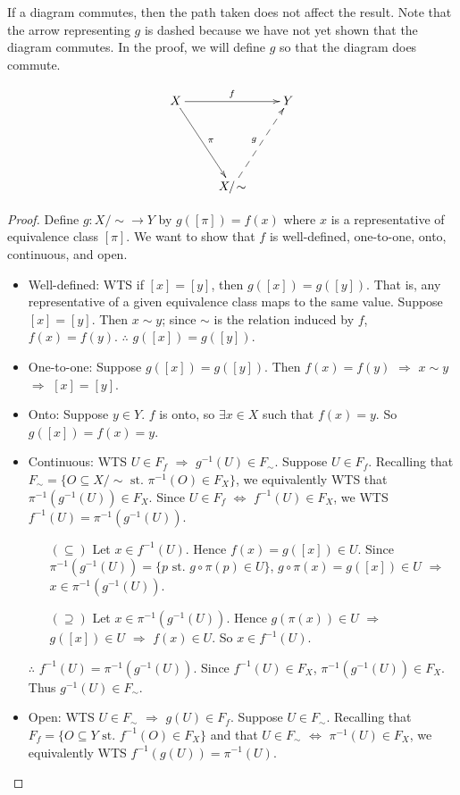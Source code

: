 If a diagram commutes, then the path taken does not affect the result. Note that the arrow representing $g$ is dashed because we have not yet shown that the diagram commutes. In the proof, we will define $g$ so that the diagram does commute.

\[ \xymatrix{ X \ar[rr]^f \ar[ddr]^\pi & & Y \\
\\
& X/\!\sim \ar@{-->}[uur]^g } \]
\begin{proof}
	Define $g \colon X/\!\sim \rightarrow Y$ by $g([\pi]) = f(x)$ where $x$ is a representative of equivalence class $[\pi]$. We want to show that $f$ is well-defined, one-to-one, onto, continuous, and open. 
	\begin{itemize}
		\item Well-defined: WTS if $[x]=[y]$, then $g([x])=g([y])$. That is, any representative of a given equivalence class maps to the same value. Suppose $[x]=[y]$. Then $x \sim y$; since $\sim$ is the relation induced by $f$, $f(x)=f(y)$. $\therefore$ $g([x])=g([y])$. 
		\item One-to-one: Suppose $g([x])=g([y])$. Then $f(x)=f(y)$ $\Rightarrow$ $x \sim y$ $\Rightarrow$ $[x]=[y]$. 
		\item Onto: Suppose $y \in Y$. $f$ is onto, so $\exists x \in X$ such that $f(x)=y$. So $g([x]) = f(x) = y$. 
		\item Continuous: WTS $U \in F_f$ $\Rightarrow$ $g^{-1}(U) \in F_\sim$. Suppose $U \in F_f$. Recalling that $F_\sim = \{ O \subseteq X/\!\sim \text{ st. } \pi^{-1}(O) \in F_X \}$, we equivalently WTS that $\pi^{-1}(g^{-1}(U)) \in F_X$. Since $U \in F_f$ $\Leftrightarrow$ $f^{-1}(U) \in F_X$, we WTS $f^{-1}(U) = \pi^{-1}(g^{-1}(U))$. 
		\begin{itemize}
			\item[$(\subseteq)$] Let $x \in f^{-1}(U)$. Hence $f(x) = g([x]) \in U$. Since $\pi^{-1}(g^{-1}(U)) = \{ p \text{ st. } g \circ \pi (p) \in U \}$, $g \circ \pi (x) = g([x]) \in U$ $\Rightarrow$ $x \in \pi^{-1}(g^{-1}(U))$. 
			\item[$(\supseteq)$] Let $x \in \pi^{-1}(g^{-1}(U))$. Hence $g(\pi(x)) \in U$ $\Rightarrow$ $g([x]) \in U$ $\Rightarrow$ $f(x) \in U$. So $x \in f^{-1}(U)$. 
		\end{itemize}
		$\therefore$ $f^{-1}(U) = \pi^{-1}(g^{-1}(U))$. Since $f^{-1}(U) \in F_X$, $\pi^{-1}(g^{-1}(U)) \in F_X$. Thus $g^{-1}(U) \in F_\sim$. 
		\item Open: WTS $U \in F_\sim$ $\Rightarrow$ $g(U) \in F_f$. Suppose $U \in F_\sim$. Recalling that $F_f = \{ O \subseteq Y \text{ st. } f^{-1}(O) \in F_X \}$ and that $U \in F_\sim$ $\Leftrightarrow$ $\pi^{-1}(U) \in F_X$, we equivalently WTS $f^{-1}(g(U)) = \pi^{-1}(U)$. 

\end{itemize}
\end{proof}
